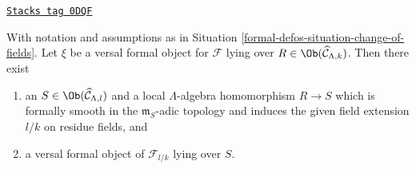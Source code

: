 \begin{lemma}
\label{formal-defos-lemma-change-of-field-versal-ring}
\href{https://stacks.math.columbia.edu/tag/0DQF}{\texttt{Stacks tag 0DQF}}

With notation and assumptions as in Situation \ref{formal-defos-situation-change-of-fields}.
Let $\xi$ be a versal formal object for $\mathcal{F}$ lying over
$R \in \Ob(\widehat{\mathcal{C}}_{\Lambda, k})$. Then there exist
\begin{enumerate}
\item an $S \in \Ob(\widehat{\mathcal{C}}_{\Lambda, l})$
and a local $\Lambda$-algebra homomorphism $R \to S$ which is
formally smooth in the $\mathfrak m_S$-adic topology and induces
the given field extension $l/k$ on residue fields, and
\item a versal formal object of $\mathcal{F}_{l/k}$ lying over $S$.
\end{enumerate}
\end{lemma}

